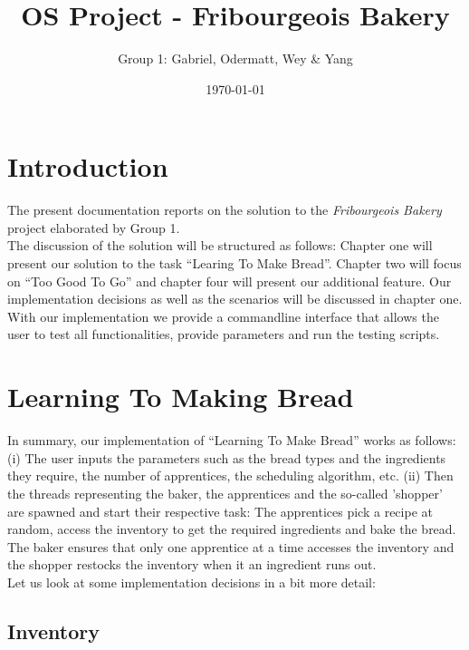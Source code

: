 \documentclass[11pt]{article}
\author{Group 1: Gabriel, Odermatt, Wey \& Yang}
\date{\today}
\title{OS Project - Fribourgeois Bakery}
\begin{document}
\maketitle
\tableofcontents

\setlength\parindent{0pt}
\setlength\parskip{-9pt}

\section{Introduction}
\label{sec:orgf1ca9ce}

The present documentation reports on the solution to the \emph{Fribourgeois Bakery} project elaborated by Group 1.\\

The discussion of the solution will be structured as follows: Chapter one will present our solution to the task ``Learing To Make Bread''. Chapter two will focus on ``Too Good To Go'' and chapter four will present our additional feature. Our implementation decisions as well as the scenarios will be discussed in chapter one.\\

With our implementation we provide a commandline interface that allows the user to test all functionalities, provide parameters and run the testing scripts.\\

\section{Learning To Making Bread}
\label{sec:orga6e5020}

In summary, our implementation of ``Learning To Make Bread'' works as follows: (i) The user inputs the parameters such as the bread types and the ingredients they require, the number of apprentices, the scheduling algorithm, etc. (ii) Then the threads representing the baker, the apprentices and the so-called 'shopper' are spawned and start their respective task: The apprentices pick a recipe at random, access the inventory to get the required ingredients and bake the bread. The baker ensures that only one apprentice at a time accesses the inventory and the shopper restocks the inventory when it an ingredient runs out.\\

Let us look at some implementation decisions in a bit more detail:\\

\subsection{Inventory}
\label{sec:orgc17b095}
\end{document}
